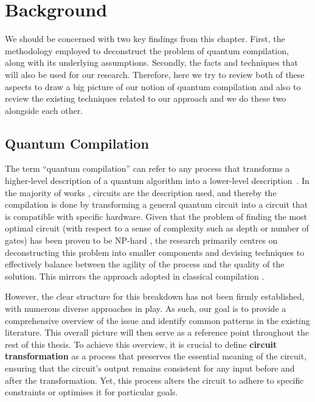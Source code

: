 \chapter{Background}\label{chap:background}

We should be concerned with two key findings from this chapter. First, the methodology employed to deconstruct the problem of quantum compilation, along with its underlying assumptions. Secondly, the facts and techniques that will also be used for our research. Therefore, here we try to review both of these aspects to draw a big picture of our notion of quantum compilation and also to review the existing techniques related to our approach and we do these two alongside each other.

\section{Quantum Compilation}
The term ``quantum compilation'' can refer to any process that transforms a higher-level description of a quantum algorithm into a lower-level description~\cite{hundt2022}. In the majority of works \cite{zulehner2018,childs,cross2022,sivarajah2021,qiskit2023,paler2021}, circuits are the description used, and thereby the compilation is done by transforming a general quantum circuit into a circuit that is compatible with specific hardware. Given that the problem of finding the most optimal circuit (with respect to a sense of complexity such as depth or number of gates) has been proven to be NP-hard \cite{siraichi2018}, the research primarily centres on deconstructing this problem into smaller components and devising techniques to effectively balance between the agility of the process and the quality of the solution. This mirrors the approach adopted in classical compilation \cite{allen2001}.

However, the clear structure for this breakdown has not been firmly established, with numerous diverse approaches in play. As such, our goal is to provide a comprehensive overview of the issue and identify common patterns in the existing literature. This overall picture will then serve as a reference point throughout the rest of this thesis. To achieve this overview, it is crucial to define \textbf{circuit transformation} as a process that preserves the essential meaning of the circuit, ensuring that the circuit's output remains consistent for any input before and after the transformation. Yet, this process alters the circuit to adhere to specific constraints or optimises it for particular goals.

